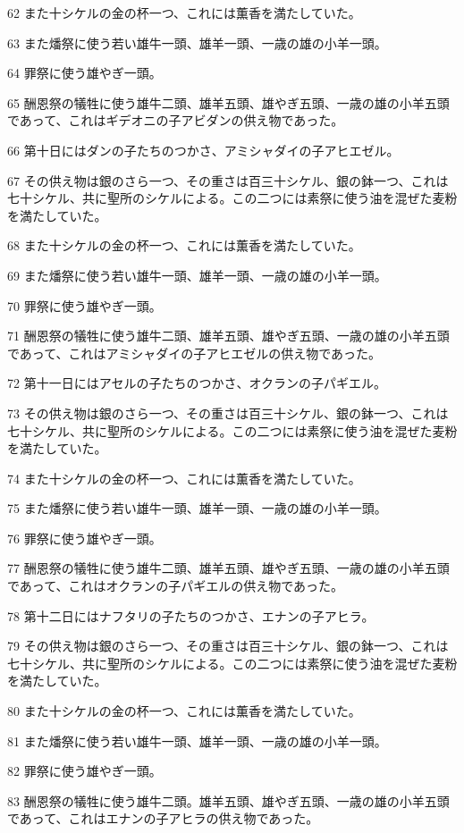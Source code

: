 \par 62 また十シケルの金の杯一つ、これには薫香を満たしていた。
\par 63 また燔祭に使う若い雄牛一頭、雄羊一頭、一歳の雄の小羊一頭。
\par 64 罪祭に使う雄やぎ一頭。
\par 65 酬恩祭の犠牲に使う雄牛二頭、雄羊五頭、雄やぎ五頭、一歳の雄の小羊五頭であって、これはギデオニの子アビダンの供え物であった。
\par 66 第十日にはダンの子たちのつかさ、アミシャダイの子アヒエゼル。
\par 67 その供え物は銀のさら一つ、その重さは百三十シケル、銀の鉢一つ、これは七十シケル、共に聖所のシケルによる。この二つには素祭に使う油を混ぜた麦粉を満たしていた。
\par 68 また十シケルの金の杯一つ、これには薫香を満たしていた。
\par 69 また燔祭に使う若い雄牛一頭、雄羊一頭、一歳の雄の小羊一頭。
\par 70 罪祭に使う雄やぎ一頭。
\par 71 酬恩祭の犠牲に使う雄牛二頭、雄羊五頭、雄やぎ五頭、一歳の雄の小羊五頭であって、これはアミシャダイの子アヒエゼルの供え物であった。
\par 72 第十一日にはアセルの子たちのつかさ、オクランの子パギエル。
\par 73 その供え物は銀のさら一つ、その重さは百三十シケル、銀の鉢一つ、これは七十シケル、共に聖所のシケルによる。この二つには素祭に使う油を混ぜた麦粉を満たしていた。
\par 74 また十シケルの金の杯一つ、これには薫香を満たしていた。
\par 75 また燔祭に使う若い雄牛一頭、雄羊一頭、一歳の雄の小羊一頭。
\par 76 罪祭に使う雄やぎ一頭。
\par 77 酬恩祭の犠牲に使う雄牛二頭、雄羊五頭、雄やぎ五頭、一歳の雄の小羊五頭であって、これはオクランの子パギエルの供え物であった。
\par 78 第十二日にはナフタリの子たちのつかさ、エナンの子アヒラ。
\par 79 その供え物は銀のさら一つ、その重さは百三十シケル、銀の鉢一つ、これは七十シケル、共に聖所のシケルによる。この二つには素祭に使う油を混ぜた麦粉を満たしていた。
\par 80 また十シケルの金の杯一つ、これには薫香を満たしていた。
\par 81 また燔祭に使う若い雄牛一頭、雄羊一頭、一歳の雄の小羊一頭。
\par 82 罪祭に使う雄やぎ一頭。
\par 83 酬恩祭の犠牲に使う雄牛二頭。雄羊五頭、雄やぎ五頭、一歳の雄の小羊五頭であって、これはエナンの子アヒラの供え物であった。
